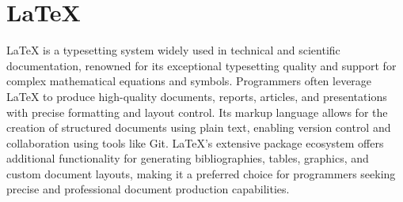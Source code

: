 \chapter{\LaTeX}
\thispagestyle{fancy}
\lstset{language=tex, style=latexstyle}

LaTeX is a typesetting system widely used in technical and scientific documentation, renowned for its exceptional typesetting quality and support for complex mathematical equations and symbols. Programmers often leverage LaTeX to produce high-quality documents, reports, articles, and presentations with precise formatting and layout control. Its markup language allows for the creation of structured documents using plain text, enabling version control and collaboration using tools like Git. LaTeX's extensive package ecosystem offers additional functionality for generating bibliographies, tables, graphics, and custom document layouts, making it a preferred choice for programmers seeking precise and professional document production capabilities.